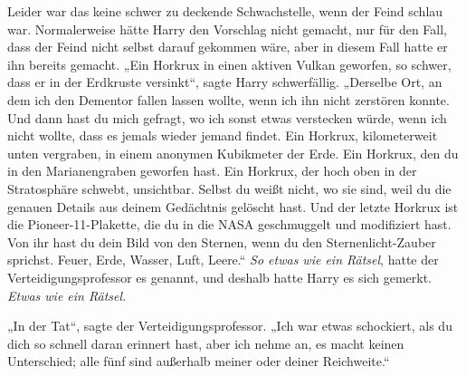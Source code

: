 Leider war das keine schwer zu deckende Schwachstelle, wenn der Feind schlau war.
Normalerweise hätte Harry den Vorschlag nicht gemacht, nur für den Fall, dass der Feind nicht selbst darauf gekommen wäre, aber in diesem Fall hatte er ihn bereits gemacht.
„Ein Horkrux in einen aktiven Vulkan geworfen, so schwer, dass er in der Erdkruste versinkt“, sagte Harry schwerfällig.
„Derselbe Ort, an dem ich den Dementor fallen lassen wollte, wenn ich ihn nicht zerstören konnte. Und dann hast du mich gefragt, wo ich sonst etwas verstecken würde, wenn ich nicht wollte, dass es jemals wieder jemand findet. Ein Horkrux, kilometerweit unten vergraben, in einem anonymen Kubikmeter der Erde. Ein Horkrux, den du in den Marianengraben geworfen hast. Ein Horkrux, der hoch oben in der Stratosphäre schwebt, unsichtbar. Selbst du weißt nicht, wo sie sind, weil du die genauen Details aus deinem Gedächtnis gelöscht hast. Und der letzte Horkrux ist die Pioneer-11-Plakette, die du in die NASA geschmuggelt und modifiziert hast. Von ihr hast du dein Bild von den Sternen, wenn du den Sternenlicht-Zauber sprichst. Feuer, Erde, Wasser, Luft, Leere.“
\emph{So etwas wie ein Rätsel}, hatte der Verteidigungsprofessor es genannt, und deshalb hatte Harry es sich gemerkt.
\emph{Etwas wie ein Rätsel.}%

„In der Tat“, sagte der Verteidigungsprofessor.
„Ich war etwas schockiert, als du dich so schnell daran erinnert hast, aber ich nehme an, es macht keinen Unterschied; alle fünf sind außerhalb meiner oder deiner Reichweite.“

